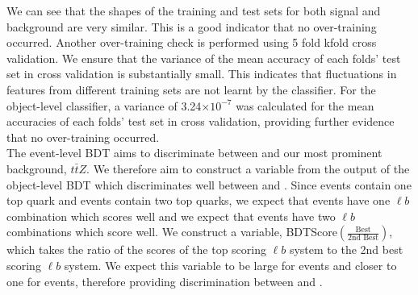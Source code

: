 We can see that the shapes of the training and test sets for both signal and background are very similar. This is a good indicator that no over-training occurred. Another over-training check is performed using 5 fold kfold cross validation. We ensure that the variance of the mean accuracy of each folds' test set in cross validation is substantially small. This indicates that fluctuations in features from different training sets are not learnt by the classifier. For the object-level classifier, a variance of 3.24$\times 10^{-7}$ was calculated for the mean accuracies of each folds' test set in cross validation, providing further evidence that no over-training occurred. \\

The event-level BDT aims to discriminate between \tWZ and our most prominent background, $t\bar{t}Z$. We therefore aim to construct a variable from the output of the object-level BDT which discriminates well between \tWZ and \ttZ. Since \tWZ events contain one top quark and \ttZ events contain two top quarks, we expect that \tWZ events have one $\ell b$ combination which scores well and we expect that \ttZ events have two $\ell b$ combinations which score well. We construct a variable, BDTScore$(\frac{\text{Best}}{\text{2nd Best}})$, which takes the ratio of the scores of the top scoring $\ell b$ system to the 2nd best scoring $\ell b$ system. We expect this variable to be large for \tWZ events and closer to one for \ttZ events, therefore providing discrimination between \tWZ and \ttZ.\\

